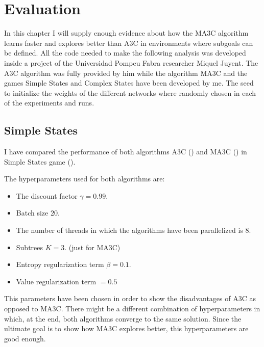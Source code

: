 \chapter{Evaluation}

In this chapter I will supply enough evidence about how the \ac{MA3C} algorithm learns faster and explores better than
\ac{A3C} in environments where subgoals can be defined.
All the code needed to make the following analysis was developed inside a project of the Universidad Pompeu Fabra researcher
Miquel Juyent.
The \ac{A3C} algorithm was fully provided by him while the algorithm \ac{MA3C} and the games Simple States and Complex
States have been developed by me.
The seed to initialize the weights of the different networks where randomly chosen in each of the experiments and runs.

\section{Simple States}

I have compared the performance of both algorithms \ac{A3C} () and \ac{MA3C} () in Simple
States game ().

The hyperparameters used for both algorithms are:
\begin{itemize} %
    \item The discount factor $\gamma = 0.99$.
    \item Batch size $20$. %
    \item The number of threads in which the algorithms have been parallelized is $8$.
    \item Subtrees $K = 3$. (just for \ac{MA3C})
    \item Entropy regularization term $\beta = 0.1$.
    \item Value regularization term $ = 0.5$ %
\end{itemize}

This parameters have been chosen in order to show the disadvantages of \ac{A3C} as opposed to \ac{MA3C}.
There might be a different combination of hyperparameters in which, at the end, both algorithms converge to the same solution.
Since the ultimate goal is to show how \ac{MA3C} explores better, this hyperparameters are good enough.

